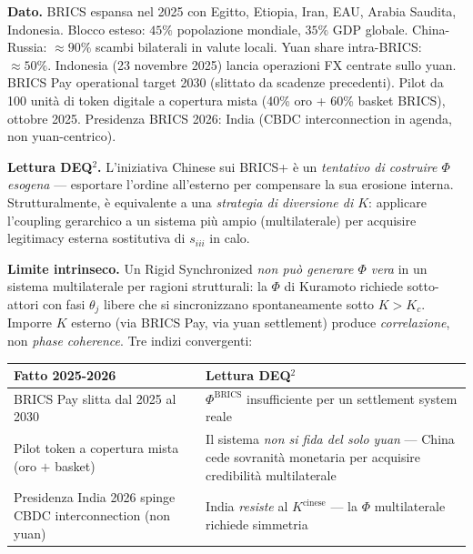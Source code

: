 \Proved{} \textbf{Dato.} BRICS espansa nel 2025 con Egitto, Etiopia,
Iran, EAU, Arabia Saudita, Indonesia. Blocco esteso: \(45\%\)
popolazione mondiale, \(35\%\) GDP globale. China-Russia:
\(\approx 90\%\) scambi bilaterali in valute locali. Yuan share
intra-BRICS: \(\approx 50\%\). Indonesia (23 novembre 2025) lancia
operazioni FX centrate sullo yuan. BRICS Pay operational target 2030
(slittato da scadenze precedenti). Pilot da 100 unità di token digitale
a copertura mista (40\% oro + 60\% basket BRICS), ottobre 2025.
Presidenza BRICS 2026: India (CBDC interconnection in agenda, non
yuan-centrico).

\Hypoth{} \textbf{Lettura DEQ$^2$.} L'iniziativa Chinese sui BRICS+ è un
\emph{tentativo di costruire \(\Phi\) esogena} --- esportare l'ordine
all'esterno per compensare la sua erosione interna. Strutturalmente, è
equivalente a una \emph{strategia di diversione di \(K\)}: applicare
l'coupling gerarchico a un sistema più ampio (multilaterale) per
acquisire legitimacy esterna sostitutiva di \(s_{iii}\) in calo.

\Proved{} \textbf{Limite intrinseco.} Un Rigid Synchronized \emph{non
può generare \(\Phi\) vera} in un sistema multilaterale per ragioni
strutturali: la \(\Phi\) di Kuramoto richiede sotto-attori con fasi
\(\theta_j\) libere che si sincronizzano spontaneamente sotto
\(K > K_c\). Imporre \(K\) esterno (via BRICS Pay, via yuan settlement)
produce \emph{correlazione}, non \emph{phase coherence}. Tre indizi
convergenti:

{\def\LTcaptype{none} %
{\small\begin{longtable}[]{@{}
  >{\raggedright\arraybackslash}p{}
  >{\raggedright\arraybackslash}p{}@{}}
\toprule\noalign{}
\begin{minipage}[b]{\linewidth}\raggedright
Fatto 2025-2026
\end{minipage} & \begin{minipage}[b]{\linewidth}\raggedright
Lettura DEQ$^2$
\end{minipage} \\
\midrule\noalign{}
\endhead
\bottomrule\noalign{}
\endlastfoot
BRICS Pay slitta dal 2025 al 2030 & \(\Phi^{\text{BRICS}}\)
insufficiente per un settlement system reale \\
Pilot token a copertura mista (oro \(+\) basket) & Il sistema \emph{non
si fida del solo yuan} --- China cede sovranità monetaria per acquisire
credibilità multilaterale \\
Presidenza India 2026 spinge CBDC interconnection (non yuan) & India
\emph{resiste} al \(K^{\text{cinese}}\) --- la \(\Phi\) multilaterale
richiede simmetria \\
\end{longtable}}
}

